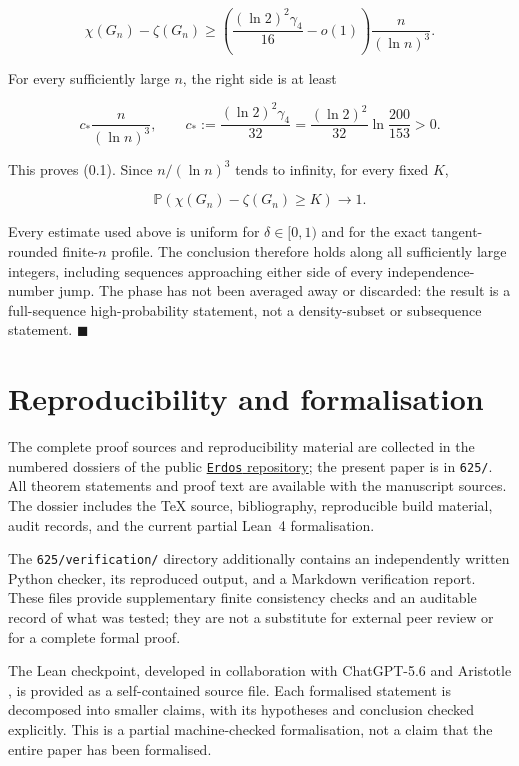 \documentclass[11pt,reqno]{amsart}
\newcommand{\Prob}[1]{\mathbb{P}\!\left(#1\right)}
\begin{document}
\[
 \chi(G_n)-\zeta(G_n)
 \ge\left(\frac{(\ln 2)^2\gamma_4}{16}-o(1)\right)
        \frac n{(\ln n)^3}.                                    \tag{11.1}
\]

For every sufficiently large \(n\), the right side is at least

\[
 c_*\frac n{(\ln n)^3},\qquad
 c_*:=\frac{(\ln 2)^2\gamma_4}{32}
 =\frac{(\ln 2)^2}{32}\ln\frac{200}{153}>0.              \tag{11.2}
\]

This proves (0.1). Since \(n/(\ln n)^3\) tends to infinity, for
every fixed \(K\),

\[
 \Prob{\chi(G_n)-\zeta(G_n)\ge K}\longrightarrow1.      \tag{11.3}
\]

Every estimate used above is uniform for \(\delta \in [0,1)\) and for the
exact tangent-rounded finite-\(n\) profile. The conclusion therefore holds
along all sufficiently large integers, including sequences approaching
either side of every independence-number jump. The phase has not been
averaged away or discarded: the result is a full-sequence high-probability
statement, not a density-subset or subsequence statement. \(\blacksquare\)

\section*{Reproducibility and formalisation}

The complete proof sources and reproducibility material are collected in the
numbered dossiers of the public
\href{https://github.com/SamPetkov/Erdos}{\texttt{Erdos} repository}; the
present paper is in \texttt{625/}. All theorem statements and proof text are
available with the manuscript sources. The dossier includes the TeX source,
bibliography, reproducible build material, audit records, and the current
partial Lean~4 formalisation.

The \texttt{625/verification/} directory additionally contains an
independently written Python checker, its reproduced output, and a Markdown
verification report. These files provide supplementary finite consistency
checks and an auditable record of what was tested; they are not a substitute
for external peer review or for a complete formal proof.

The Lean checkpoint, developed in collaboration with ChatGPT-5.6 and Aristotle
\citep{achim-et-al-2025}, is provided as a self-contained source file. Each
formalised statement is decomposed into smaller claims, with its hypotheses
and conclusion checked explicitly. This is a partial machine-checked
formalisation, not a claim that the entire paper has been formalised.
\end{document}

